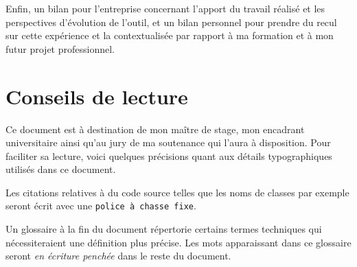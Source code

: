 Enfin, un bilan pour l'entreprise concernant l'apport du travail réalisé et
les perspectives d'évolution de l'outil, et un bilan personnel pour prendre du
recul sur cette expérience et la contextualisée par rapport à ma formation et à
mon futur projet professionnel.

\section*{Conseils de lecture}

Ce document est à destination de mon maître de stage, mon encadrant
universitaire ainsi qu'au jury de ma soutenance qui l'aura à disposition. Pour
faciliter sa lecture, voici quelques précisions quant aux détails typographiques
utilisés dans ce document.

Les citations relatives à du code source telles que les noms de classes par
exemple seront écrit avec une {\tt police à chasse fixe}.

Un glossaire à la fin du document répertorie certains termes techniques qui
nécessiteraient une définition plus précise. Les mots apparaissant dans ce
glossaire seront {\sl en écriture penchée} dans le reste du document.
